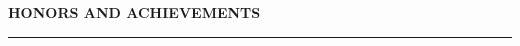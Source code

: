 \documentclass[a4paper]{article}
\newcommand{\myline}{\par
  \kern2pt %
  \hrule height 0.5pt
  \kern2pt %
}
\newcommand{\mybullet}{
	\indent 
  \textbullet \hspace*{2mm}
}
\begin{document}
			

	
		
	
	\noindent
	{\large \textbf{HONORS AND ACHIEVEMENTS}}
	\myline 
	\smallskip
\end{document}
